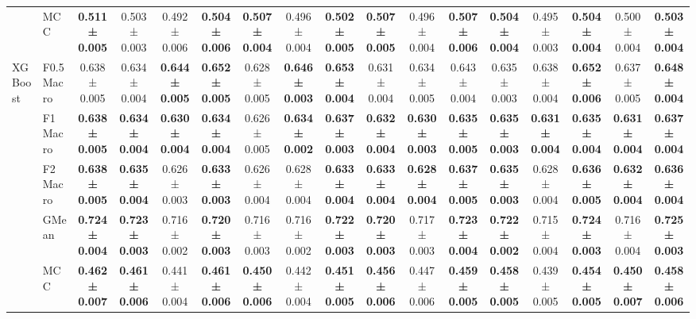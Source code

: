 \begin{table}[H]
{\begin{tabular}{llccccccccccccccc}
 & MCC & \textbf{0.511 ± 0.005} & 0.503 ± 0.003 & 0.492 ± 0.006 & \textbf{0.504 ± 0.006} & \textbf{0.507 ± 0.004} & 0.496 ± 0.004 & \textbf{0.502 ± 0.005} & \textbf{0.507 ± 0.005} & 0.496 ± 0.004 & \textbf{0.507 ± 0.006} & \textbf{0.504 ± 0.004} & 0.495 ± 0.003 & \textbf{0.504 ± 0.004} & 0.500 ± 0.004 & \textbf{0.503 ± 0.004} \\
\cline{1-17}
\multirow[t]{5}{*}{XGBoost} & F0.5 Macro & 0.638 ± 0.005 & 0.634 ± 0.004 & \textbf{0.644 ± 0.005} & \textbf{0.652 ± 0.005} & 0.628 ± 0.005 & \textbf{0.646 ± 0.003} & \textbf{0.653 ± 0.004} & 0.631 ± 0.004 & 0.634 ± 0.005 & 0.643 ± 0.004 & 0.635 ± 0.003 & 0.638 ± 0.004 & \textbf{0.652 ± 0.006} & 0.637 ± 0.005 & \textbf{0.648 ± 0.004} \\
 & F1 Macro & \textbf{0.638 ± 0.005} & \textbf{0.634 ± 0.004} & \textbf{0.630 ± 0.004} & \textbf{0.634 ± 0.004} & 0.626 ± 0.005 & \textbf{0.634 ± 0.002} & \textbf{0.637 ± 0.003} & \textbf{0.632 ± 0.004} & \textbf{0.630 ± 0.003} & \textbf{0.635 ± 0.005} & \textbf{0.635 ± 0.003} & \textbf{0.631 ± 0.004} & \textbf{0.635 ± 0.004} & \textbf{0.631 ± 0.004} & \textbf{0.637 ± 0.004} \\
 & F2 Macro & \textbf{0.638 ± 0.005} & \textbf{0.635 ± 0.004} & 0.626 ± 0.003 & \textbf{0.633 ± 0.003} & 0.626 ± 0.004 & 0.628 ± 0.004 & \textbf{0.633 ± 0.004} & \textbf{0.633 ± 0.004} & \textbf{0.628 ± 0.004} & \textbf{0.637 ± 0.005} & \textbf{0.635 ± 0.003} & 0.628 ± 0.004 & \textbf{0.636 ± 0.005} & \textbf{0.632 ± 0.004} & \textbf{0.636 ± 0.004} \\
 & GMean & \textbf{0.724 ± 0.004} & \textbf{0.723 ± 0.003} & 0.716 ± 0.002 & \textbf{0.720 ± 0.003} & 0.716 ± 0.003 & 0.716 ± 0.002 & \textbf{0.722 ± 0.003} & \textbf{0.720 ± 0.003} & 0.717 ± 0.003 & \textbf{0.723 ± 0.004} & \textbf{0.722 ± 0.002} & 0.715 ± 0.004 & \textbf{0.724 ± 0.003} & 0.716 ± 0.004 & \textbf{0.725 ± 0.003} \\
 & MCC & \textbf{0.462 ± 0.007} & \textbf{0.461 ± 0.006} & 0.441 ± 0.004 & \textbf{0.461 ± 0.006} & \textbf{0.450 ± 0.006} & 0.442 ± 0.004 & \textbf{0.451 ± 0.005} & \textbf{0.456 ± 0.006} & 0.447 ± 0.006 & \textbf{0.459 ± 0.005} & \textbf{0.458 ± 0.005} & 0.439 ± 0.005 & \textbf{0.454 ± 0.005} & \textbf{0.450 ± 0.007} & \textbf{0.458 ± 0.006} \\
\cline{1-17}
\bottomrule
\end{tabular}
    }
\end{table}
